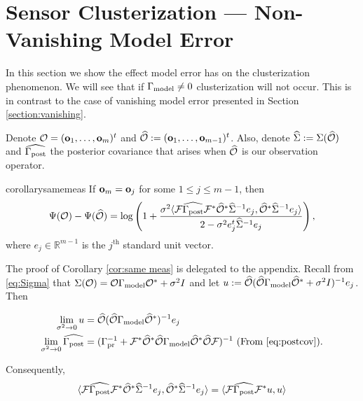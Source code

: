 \section{Sensor Clusterization --- Non-Vanishing Model Error}\label{section:non vanishing}
In this section we show the effect model error has on the
clusterization phenomenon. We will see that if $\Gamma_{\textup{model}} \neq 0$
clusterization will not occur. This is in contrast to the case of
vanishing model error presented in Section \ref{section:vanishing}.

Denote $\mathcal{O} = (\mathbf{o}_1,\dots,\mathbf{o}_m)^t$ and $\widehat{\mathcal{O}} :=
(\mathbf{o}_1,\dots,\mathbf{o}_{m-1})^t$. Also, denote $\widehat{\Sigma} := \Sigma
(\widehat{\mathcal{O}})$ and $\widehat{\Gamma_{\textup{post}}}$ the posterior covariance that arises when
$\widehat{\mathcal{O}}$ is our observation operator.
\begin{restatable*}{corollary}{samemeas}\label{cor:same meas}
  If $\mathbf{o}_m = \mathbf{o}_j$ for some $1 \leq j \leq m-1$, then
  \begin{equation*}
    \tar(\obs) - \tar(\obsm) =
    \log \left ( 1 + \frac{\sigma^2
      \langle \fwd \postcovm \fwd^* \obsm^* \Sigmam^{-1} e_j,
      \obsm^* \Sigmam^{-1}e_j \rangle
    }{
      2 - \sigma^2 e_j^t\Sigmam^{-1}e_j 
    }       
    \right ),
  \end{equation*}
  where $e_j\in \mathbb{R}^{m-1}$ is the $j^{\text{th}}$ standard unit
  vector.
\end{restatable*}
The proof of Corollary \ref{cor:same meas} is delegated to the
appendix. Recall from \eqref{eq:Sigma} that $\Sigma(\mathcal{O}) = \mathcal{O}
\Gamma_{\textup{model}} \mathcal{O}^* + \sigma^2I$ and let $u := \widehat{\mathcal{O}} (\widehat{\mathcal{O}} \Gamma_{\textup{model}} \widehat{\mathcal{O}}^*
+ \sigma^2 I)^{-1}e_j$. Then

\begin{align*}
  \begin{split}
    \lim_{\sigma^2 \to 0} u &= \obsm (\obsm \modcov \obsm^*)^{-1}e_j\\
    \lim_{\sigma^2 \to 0} \postcovm &= (\prcov^{-1} + \fwd^* \obsm^* \obsm \modcov \obsm^* \obsm \fwd)^{-1} \text{ (From \eqref{eq:postcov})}.
  \end{split}
\end{align*}

Consequently, 
\begin{equation*}
   \langle \fwd \postcovm \fwd^* \obsm^* \Sigmam^{-1}
    e_j, \obsm^* \Sigmam^{-1}e_j \rangle 
  = \langle \fwd \postcovm \fwd^* u, u \rangle
\end{equation*}

